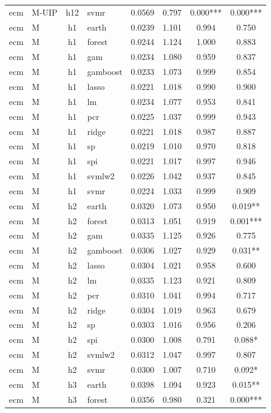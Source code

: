 \begin{ThreePartTable}
\begin{longtable}[t]{llclcccc}
ecm & M-UIP & h12 & svmr & 0.0569 & 0.797 & 0.000*** & 0.000***\\
\addlinespace
ecm & M & h1 & earth & 0.0239 & 1.101 & 0.994 & 0.750\\
ecm & M & h1 & forest & 0.0244 & 1.124 & 1.000 & 0.883\\
ecm & M & h1 & gam & 0.0234 & 1.080 & 0.959 & 0.837\\
ecm & M & h1 & gamboost & 0.0233 & 1.073 & 0.999 & 0.854\\
ecm & M & h1 & lasso & 0.0221 & 1.018 & 0.990 & 0.900\\
ecm & M & h1 & lm & 0.0234 & 1.077 & 0.953 & 0.841\\
ecm & M & h1 & pcr & 0.0225 & 1.037 & 0.999 & 0.943\\
ecm & M & h1 & ridge & 0.0221 & 1.018 & 0.987 & 0.887\\
ecm & M & h1 & sp & 0.0219 & 1.010 & 0.970 & 0.818\\
ecm & M & h1 & spi & 0.0221 & 1.017 & 0.997 & 0.946\\
ecm & M & h1 & svmlw2 & 0.0226 & 1.042 & 0.937 & 0.845\\
ecm & M & h1 & svmr & 0.0224 & 1.033 & 0.999 & 0.909\\
\addlinespace
ecm & M & h2 & earth & 0.0320 & 1.073 & 0.950 & 0.019**\\
ecm & M & h2 & forest & 0.0313 & 1.051 & 0.919 & 0.001***\\
ecm & M & h2 & gam & 0.0335 & 1.125 & 0.926 & 0.775\\
ecm & M & h2 & gamboost & 0.0306 & 1.027 & 0.929 & 0.031**\\
ecm & M & h2 & lasso & 0.0304 & 1.021 & 0.958 & 0.600\\
ecm & M & h2 & lm & 0.0335 & 1.123 & 0.921 & 0.809\\
ecm & M & h2 & pcr & 0.0310 & 1.041 & 0.994 & 0.717\\
ecm & M & h2 & ridge & 0.0304 & 1.019 & 0.963 & 0.679\\
ecm & M & h2 & sp & 0.0303 & 1.016 & 0.956 & 0.206\\
ecm & M & h2 & spi & 0.0300 & 1.008 & 0.791 & 0.088*\\
ecm & M & h2 & svmlw2 & 0.0312 & 1.047 & 0.997 & 0.807\\
ecm & M & h2 & svmr & 0.0300 & 1.007 & 0.710 & 0.092*\\
\addlinespace
ecm & M & h3 & earth & 0.0398 & 1.094 & 0.923 & 0.015**\\
ecm & M & h3 & forest & 0.0356 & 0.980 & 0.321 & 0.000***\\

\end{longtable}
\end{ThreePartTable}
